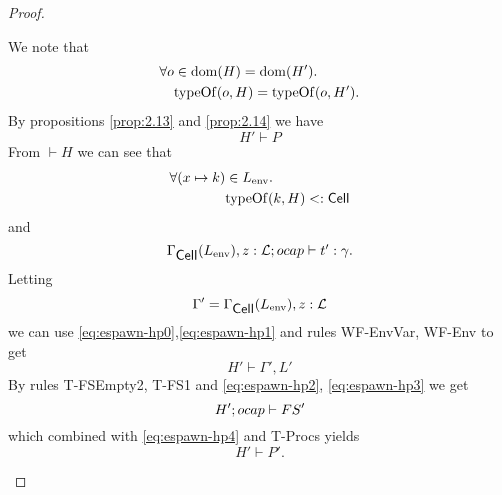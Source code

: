 \begin{proof}
\begin{description}
      We note that
      \begin{equation} \label{eq:espawn-hp0}
        \begin{aligned}
          \forall o &\in \mbox{$\mathrm{dom}$}(H) = \mbox{$\mathrm{dom}$}(H'). \\
            &\mbox{$\mathrm{typeOf}$}(o, H) = \mbox{$\mathrm{typeOf}$}(o, H').
        \end{aligned}
      \end{equation}
      By propositions \ref{prop:2.13} and \ref{prop:2.14} we have
      \begin{equation} \label{eq:espawn-hp4}
        H' \vdash P
      \end{equation}
      From $\vdash H$ we can see that
      \begin{equation} \label{eq:espawn-hp1}
        \begin{aligned}
          \forall (x \mapsto k) &\in L_{\text{env}}. \\
            &\mbox{$\mathrm{typeOf}$}(k, H) <: \mbox{$\mathsf{Cell}$}
        \end{aligned}
      \end{equation}
      and
      \begin{equation} \label{eq:espawn-hp2}
        \mbox{$\Gamma_{\mbox{$\mathsf{Cell}$}}(L_{\text{env}}), z:
        \mbox{$\mathcal{L}$};\mbox{$ocap$}\vdash t':\gamma$}.
      \end{equation}
      Letting
      \begin{equation}
        \Gamma' = \Gamma_{\mbox{$\mathsf{Cell}$}}(L_{\text{env}}), z: \mbox{$\mathcal{L}$}
      \end{equation}
      we can use \eqref{eq:espawn-hp0},\eqref{eq:espawn-hp1} and rules {\sc
      WF-EnvVar, WF-Env} to get
      \begin{equation} \label{eq:espawn-hp3}
        H' \vdash \Gamma', L'
      \end{equation}
      By rules {\sc T-FSEmpty2, T-FS1} and \eqref{eq:espawn-hp2},
      \eqref{eq:espawn-hp3} we get
      \begin{equation}
        H'; \mbox{$ocap$} \vdash FS'
      \end{equation}
      which combined with \eqref{eq:espawn-hp4} and {\sc T-Procs} yields
      \begin{equation}
        H' \vdash P'.
      \end{equation}
      

\end{description}
\end{proof}
